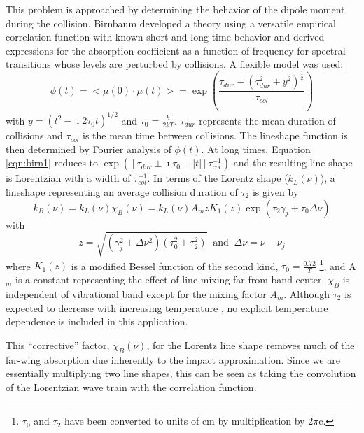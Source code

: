 \documentclass[11pt]{article}
\begin{document}
This problem is approached by determining the behavior of the dipole 
moment during the collision.  Birnbaum developed a theory using a 
versatile empirical correlation function \cite{bir:76,bir:79} with known 
short and long time behavior and derived expressions for the absorption 
coefficient as a function of frequency for spectral transitions whose 
levels are perturbed by collisions.  A flexible model was used:
\begin{equation}
\phi(t)=<\mu(0)\cdot\mu(t)>=\exp\left(\frac{
\tau_{dur}-(\tau_{dur}^{2}+y^{2})^{\frac{1}{2}}}{\tau_{col}}\right)
\label{eqn:birn1}
\end{equation}
with $y=(t^{2}-\imath 2\tau_{0} t)^{1/2}$ and $\tau_{0}=\frac{\hbar}{2kT}$.
$\tau_{dur}$ represents the mean duration of collisions and $\tau_{col}$ is
the mean time between collisions.  The lineshape function is then
determined by Fourier analysis of $\phi(t)$.  At long times, Equation
\ref{eqn:birn1} reduces to 
$\exp\left([\tau_{dur}\pm\imath\tau_{0}-|t|]\tau_{col}^{-1}\right)$ and the
resulting line shape is Lorentzian with a width of $\tau_{col}^{-1}$. 
In terms of the Lorentz shape ($k_{L}(\nu)$), a lineshape representing an
average collision duration of $\tau_{2}$ is given by \cite{edw:91}
\begin{equation}
k_{B}(\nu)=k_{L}(\nu)\chi_{B}(\nu)=k_{L}(\nu) A_{m} z K_{1}(z)\exp\left(
\tau_{2}\gamma_{j}+\tau_{0}\Delta\nu\right)
\label{eqn:birnbaum}
\end{equation}
with
\begin{equation}
z=\sqrt{(\gamma_{j}^{2}+\Delta\nu^{2})(\tau_{0}^{2}+\tau_{2}^{2})}
\; \; \mbox{and} \; \;
\Delta\nu=\nu-\nu_{j}
\end{equation}
where $K_{1}(z)$ is a modified Bessel function of the second kind, 
$\tau_{0}=\frac{0.72}{T}$ \footnote{$\tau_0$ and $\tau_2$ have been
converted to units of $\mbox{cm}$ by multiplication by $2\pi\mbox{c}$.}, 
and A$_{m}$ is a constant representing the effect of line-mixing far 
from band center.   $\chi_{B}$ is independent of vibrational band 
except for the mixing factor $A_{m}$.  Although $\tau_2$ is expected 
to decrease with increasing temperature \cite{bir:79}, no explicit 
temperature dependence is included in this application.

This ``corrective'' factor, $\chi_{B}(\nu)$, for the Lorentz line shape 
removes much of the far-wing absorption due inherently to the impact 
approximation.
Since we are essentially multiplying two line shapes, this can be seen as
taking the convolution of the Lorentzian wave train with the correlation
function.  
\end{document}
